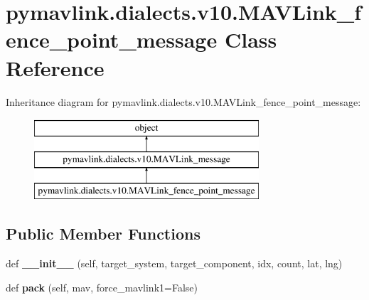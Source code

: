 \hypertarget{classpymavlink_1_1dialects_1_1v10_1_1MAVLink__fence__point__message}{}\section{pymavlink.\+dialects.\+v10.\+M\+A\+V\+Link\+\_\+fence\+\_\+point\+\_\+message Class Reference}
\label{classpymavlink_1_1dialects_1_1v10_1_1MAVLink__fence__point__message}
Inheritance diagram for pymavlink.\+dialects.\+v10.\+M\+A\+V\+Link\+\_\+fence\+\_\+point\+\_\+message\+:\begin{figure}[H]
\begin{center}
\leavevmode
\includegraphics[height=3.000000cm]{classpymavlink_1_1dialects_1_1v10_1_1MAVLink__fence__point__message}
\end{center}
\end{figure}
\subsection*{Public Member Functions}
\begin{DoxyCompactItemize}
\item 
\mbox{\label{classpymavlink_1_1dialects_1_1v10_1_1MAVLink__fence__point__message_aa35165aed1a081a02c8873c56fa92e69}} 
def {\bfseries \+\_\+\+\_\+init\+\_\+\+\_\+} (self, target\+\_\+system, target\+\_\+component, idx, count, lat, lng)
\item 
\mbox{\label{classpymavlink_1_1dialects_1_1v10_1_1MAVLink__fence__point__message_ab9f6fcd18a113c103253eafdb4aaaaba}} 
def {\bfseries pack} (self, mav, force\+\_\+mavlink1=False)
\end{DoxyCompactItemize}

